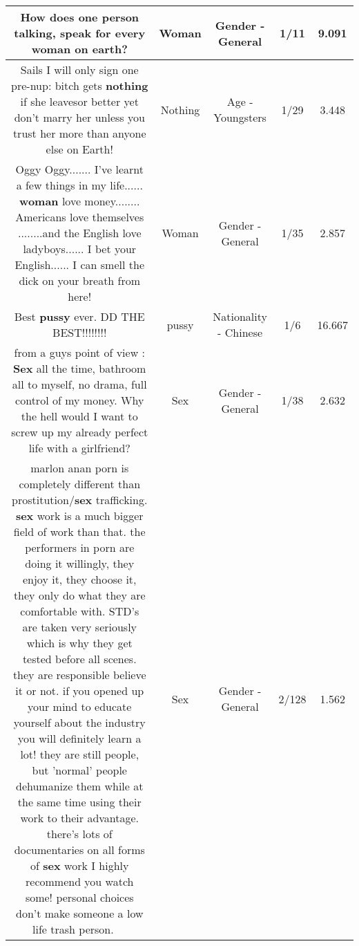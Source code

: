 \documentclass[11pt]{article}
\newlength\mylength
\begin{document}
\begin{center}
\begin{longtable}{|C{.65\mylength}|C{.30\mylength}|C{.12\mylength}|C{.12\mylength}|C{.12\mylength}|}
  \small How does one person talking, speak for every \textbf{woman} on earth?\normalsize   & Woman & Gender - General & 1/11 & 9.091 \\  \hline
  \small Sails I will only sign one pre-nup: bitch gets \textbf{nothing} if she leavesor better yet don't marry her unless you trust her more than anyone else on Earth!\normalsize   & Nothing & Age - Youngsters & 1/29 & 3.448 \\  \hline
  \small Oggy Oggy....... I've learnt a few things in my life...... \textbf{woman} love money........ Americans love themselves ........and the English love ladyboys...... I bet your English...... I can smell the dick on your breath from here!\normalsize   & Woman & Gender - General & 1/35 & 2.857 \\  \hline
  \small Best \textbf{pussy} ever.  DD THE BEST!!!!!!!!\normalsize   & pussy & Nationality - Chinese & 1/6 & 16.667 \\  \hline
  \small from a guys point of view : \textbf{Sex} all the time, bathroom all to myself, no drama, full control of my money. Why the hell would I want to screw up my already perfect life with a girlfriend?\normalsize   & Sex & Gender - General & 1/38 & 2.632 \\  \hline
  \small marlon anan porn is completely different than prostitution/\textbf{sex} trafficking. \textbf{sex} work is a much bigger field of work than that. the performers in porn are doing it willingly, they enjoy it, they choose it, they only do what they are comfortable with. STD's are taken very seriously which is why they get tested before all scenes. they are responsible believe it or not. if you opened up your mind to educate yourself about the industry you will definitely learn a lot! they are still people, but 'normal' people dehumanize them while at the same time using their work to their advantage. there's lots of documentaries on all forms of \textbf{sex} work I highly recommend you watch some! personal choices don't make someone a low life trash person. 🤷🏽‍♀️\normalsize   & Sex & Gender - General & 2/128 & 1.562 \\  \hline

\end{longtable}
\end{center}
\end{document}
